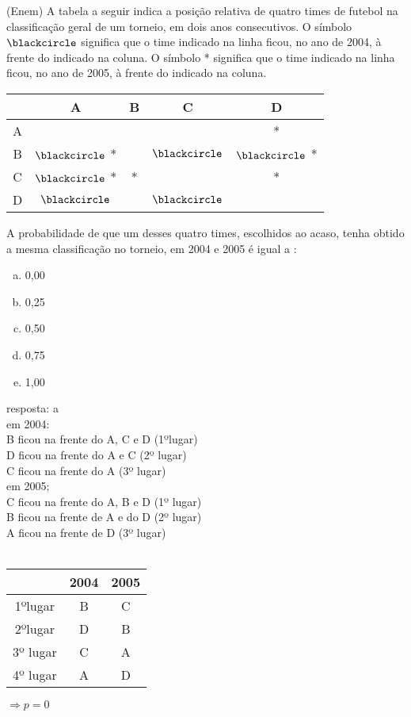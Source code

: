 \begin{ex}
 (Enem) A tabela a seguir indica a posição relativa de quatro times de futebol na classificação geral de um torneio, em dois anos consecutivos. O símbolo $\blackcircle$ significa que o time indicado na linha ficou, no ano de 2004, à frente do indicado na coluna. O símbolo * significa que o time indicado na linha ficou, no ano de 2005, à frente do indicado na coluna.
    
\begin{center}
\begin{tabular}{|c|c|c|c|c|} \hline
&  A  &  B  &  C  &  D  \\   \hline
A   &    &     &   &  *  \\ \hline
B   & $\blackcircle$  *  &    &  $\blackcircle$ & $\blackcircle$ * \\  \hline
C   & $\blackcircle$ *  &  * &    & *  \\ \hline
D   & $\blackcircle$  &     & $\blackcircle$ &     \\  \hline
\end{tabular}
\end{center}
A probabilidade de que um desses quatro times, escolhidos ao acaso, tenha obtido a mesma classificação no torneio, em 2004 e 2005 é igual a :
   \begin{enumerate}[(a)]
   \item 0,00
   \item 0,25
   \item 0,50
   \item 0,75
   \item 1,00
   \end{enumerate}
     \begin{sol}
      resposta: a \\
      em 2004: \\ 
      B ficou na frente do A, C e D (1ºlugar) \\
      D ficou na frente do A e C (2º lugar) \\
      C ficou na frente do A (3º lugar) \\
      em 2005; \\
      C ficou na frente do A, B e D (1º lugar) \\
      B ficou na frente de A e do D (2º lugar) \\
      A ficou na frente de D (3º lugar) \\ \\
        \begin{tabular}{|c|c|c|} \hline
             & 2004 & 2005  \\  \hline
           1ºlugar  & B & C  \\ \hline
           2ºlugar & D & B   \\  \hline
           3º lugar & C & A \\  \hline
           4º lugar & A & D \\  \hline 
        \end{tabular} \hspace{0,5cm}$\Longrightarrow  p=0 $
     \end{sol}
\end{ex}